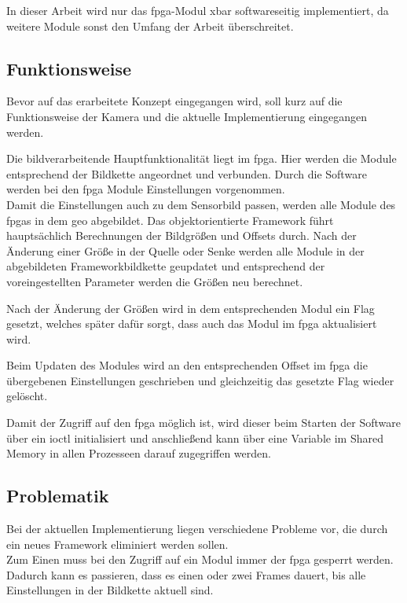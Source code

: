 In dieser Arbeit wird nur das \ac{fpga}-Modul \ac{xbar} softwareseitig implementiert, da weitere Module sonst den Umfang der Arbeit überschreitet. 


\subsection{Funktionsweise}
Bevor auf das erarbeitete Konzept eingegangen wird, soll kurz auf die Funktionsweise der Kamera und die aktuelle Implementierung eingegangen werden.

Die bildverarbeitende Hauptfunktionalität liegt im \ac{fpga}. Hier werden die Module entsprechend der Bildkette angeordnet und verbunden. Durch die Software werden bei den \ac{fpga} Module Einstellungen vorgenommen.\\


Damit die Einstellungen auch zu dem Sensorbild passen, werden alle Module des \ac{fpga}s in dem \ac{geo} abgebildet. Das objektorientierte Framework führt hauptsächlich Berechnungen der Bildgrößen und Offsets durch. Nach der Änderung einer Größe in der Quelle oder Senke werden alle Module in der abgebildeten Frameworkbildkette geupdatet und entsprechend der voreingestellten Parameter werden die Größen neu berechnet. 

Nach der Änderung der Größen wird in dem entsprechenden Modul ein Flag gesetzt, welches später dafür sorgt, dass auch das Modul im \ac{fpga} aktualisiert wird. 

Beim Updaten des Modules wird an den entsprechenden Offset im \ac{fpga} die übergebenen Einstellungen geschrieben und gleichzeitig das gesetzte Flag wieder gelöscht. 

Damit der Zugriff auf den \ac{fpga} möglich ist, wird dieser beim Starten der Software über ein \ac{ioctl} initialisiert und anschließend kann über eine Variable im Shared Memory in allen Prozesseen darauf zugegriffen werden.

\subsection{Problematik}\label{sec:prob}
Bei der aktuellen Implementierung liegen verschiedene Probleme vor, die durch ein neues Framework eliminiert werden sollen.\\

Zum Einen muss bei den Zugriff auf ein Modul immer der \ac{fpga} gesperrt werden. Dadurch kann es passieren, dass es einen oder zwei Frames dauert, bis alle Einstellungen in der Bildkette aktuell sind.\\


